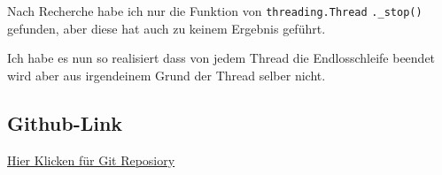 Nach Recherche habe ich nur die Funktion von \verb|threading.Thread| \verb|._stop()| gefunden, aber diese hat auch zu keinem Ergebnis geführt.

Ich habe es nun so realisiert dass von jedem Thread die Endlosschleife beendet wird aber aus irgendeinem Grund der Thread selber nicht. 
 

\subsection{Github-Link}

\hyperlink{https://github.com/mwoelfer-tgm/sew1617/tree/master/thread_queues}{Hier Klicken für Git Reposiory}
